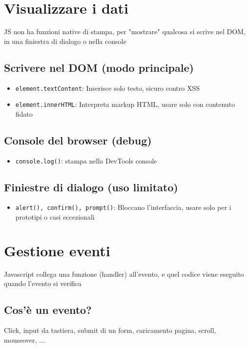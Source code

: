 \section{Visualizzare i dati}
JS non ha funzioni native di stampa, per "mostrare" qualcosa si scrive nel DOM, in una finiestra di dialogo o nella console

\subsection{Scrivere nel DOM (modo principale)}
\begin{itemize}
    \item \texttt{element.textContent}: Inserisce solo testo, sicuro contro XSS
    \item \texttt{element.innerHTML}: Interpreta markup HTML, usare solo con contenuto fidato
\end{itemize}
\subsection{Console del browser (debug)}
\begin{itemize}
    \item \texttt{console.log()}: stampa nella DevTools console
\end{itemize}
\subsection{Finiestre di dialogo (uso limitato)}
\begin{itemize}
    \item \texttt{alert(), confirm(), prompt()}: Bloccano l'interfaccia, usare solo per i prototipi o casi eccezionali  
\end{itemize}

\section{Gestione eventi}
Javascript collega una funzione (handler) all'evento, e quel codice viene eseguito quando l'evento si verifica

\subsection{Cos'è un evento?}
Click, input da tastiera, submit di un form, caricamento pagina, scroll, mouseover, ...

